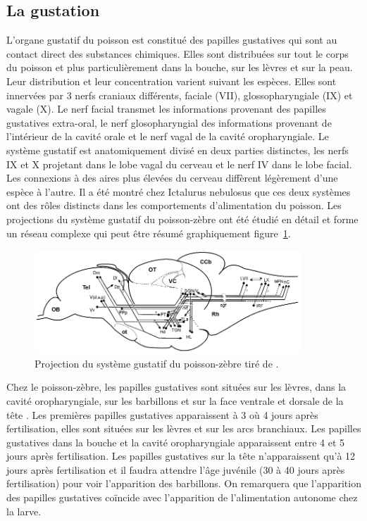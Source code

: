   \subsection{La gustation}
  L'organe gustatif du poisson est constitué des papilles gustatives qui sont au contact direct des substances chimiques. Elles sont distribuées sur tout le corps du poisson et plus particulièrement dans la bouche, sur les lèvres et sur la peau. Leur distribution et leur concentration varient suivant les espèces. Elles sont innervées par 3 nerfs craniaux différents, faciale (VII), glossopharyngiale (IX) et vagale (X). Le nerf facial transmet les informations provenant des papilles gustatives extra-oral, le nerf glosopharyngial des informations provenant de l'intérieur de la cavité orale et le nerf vagal de la cavité oropharyngiale. Le système gustatif est anatomiquement divisé en deux parties distinctes, les nerfs IX et X projetant dans le lobe vagal du cerveau et le nerf IV dans le lobe facial. Les connexions à des aires plus élevées du cerveau diffèrent légèrement d'une espèce à l'autre. Il a été montré chez Ictalurus nebulosus \cite{atema1971structures} que ces deux systèmes ont des rôles distincts dans les comportements d'alimentation du poisson. Les projections du système gustatif du poisson-zèbre ont été étudié en détail \cite{yanez2017gustatory} et forme un réseau complexe qui peut être résumé graphiquement figure~\ref{gustatory_connection_schematic}.
  \begin{figure}[!h]
    \centering
    \includegraphics[width=10cm]{part_2/assets/gustatory_connection_schematic.png}
    \caption{Projection du système gustatif du poisson-zèbre tiré de \cite{yanez2017gustatory}.}
    \label{gustatory_connection_schematic}
  \end{figure}
  \medbreak
  Chez le poisson-zèbre, les papilles gustatives sont situées sur les lèvres, dans la cavité oropharyngiale, sur les barbillons et sur la face ventrale et dorsale de la tête \cite{hansen2002taste}. Les premières papilles gustatives apparaissent à 3 où 4 jours après fertilisation, elles sont situées sur les lèvres et sur les arcs branchiaux. Les papilles gustatives dans la bouche et la cavité oropharyngiale apparaissent entre 4 et 5 jours après fertilisation. Les papilles gustatives sur la tête n'apparaissent qu'à 12 jours après fertilisation et il faudra attendre l'âge juvénile (30 à 40 jours après fertilisation) pour voir l'apparition des barbillons. On remarquera que l'apparition des papilles gustatives coïncide avec l'apparition de l'alimentation autonome chez la larve.

